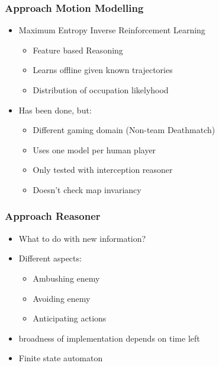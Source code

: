\documentclass{beamer}
\begin{document}
\begin{frame}
\frametitle{Approach Motion Modelling}
\begin{itemize}
    \item Maximum Entropy Inverse Reinforcement Learning
    \begin{itemize}
        \item Feature based Reasoning
        \item Learns offline given known trajectories
        \item Distribution of occupation likelyhood
    \end{itemize}
    \item Has been done, but:
        \begin{itemize}
            \item Different gaming domain (Non-team Deathmatch)
            \item Uses one model per human player
            \item Only tested with interception reasoner
            \item Doesn't check map invariancy
        \end {itemize}
\end{itemize}
\end{frame}

\begin{frame}
\frametitle{Approach Reasoner}
\begin{itemize}
    \item What to do with new information?
    \item Different aspects:
    \begin{itemize}
        \item Ambushing enemy
        \item Avoiding enemy
        \item Anticipating actions
    \end{itemize}
    \item broadness of implementation depends on time left
    \item Finite state automaton
\end{itemize}
\end{frame}
\end{document}
